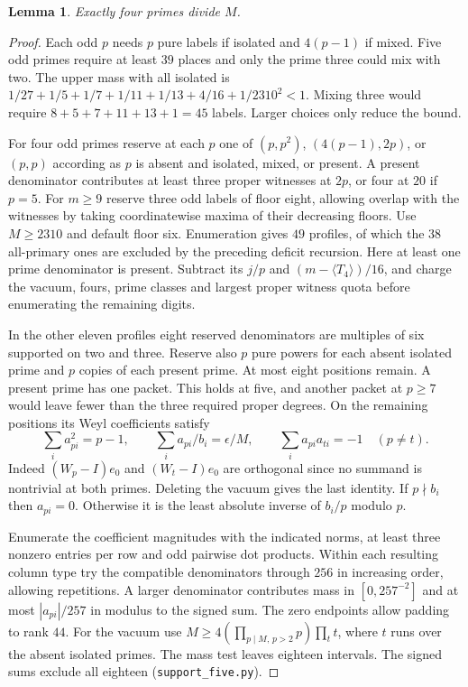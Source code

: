 \documentclass[11pt]{amsart}
\numberwithin{equation}{section}
\newtheorem{lemma}[theorem]{Lemma}
\theoremstyle{definition}
\theoremstyle{plain}
\begin{document}
\begin{lemma}
Exactly four primes divide $M$.
\end{lemma}
\begin{proof}
Each odd $p$ needs $p$ pure labels if isolated and $4(p-1)$ if mixed.
Five odd primes require at least $39$ places and only the prime three could
mix with two. The upper mass with all isolated is
$1/27+1/5+1/7+1/11+1/13+4/16+1/2310^2<1$.
Mixing three would require $8+5+7+11+13+1=45$ labels. Larger choices
only reduce the bound.

For four odd primes reserve at each $p$ one of $(p,p^2)$,
$(4(p-1),2p)$, or $(p,p)$ according as $p$ is absent and isolated,
mixed, or present. A present denominator contributes at least three
proper witnesses at $2p$, or four at $20$ if $p=5$. For $m\ge9$
reserve three odd labels of floor eight, allowing overlap with the
witnesses by taking coordinatewise maxima of their decreasing floors.
Use $M\ge2310$ and default floor six. Enumeration gives $49$
profiles, of which the $38$ all-primary ones are excluded by the
preceding deficit recursion. Here at least one prime denominator
is present. Subtract its $j/p$ and $(m-\langle T_4\rangle)/16$,
and charge the vacuum, fours, prime classes and largest proper
witness quota before enumerating the remaining digits.

In the other eleven profiles eight reserved denominators are multiples
of six supported on two and three. Reserve also $p$ pure powers
for each absent isolated prime and $p$ copies of each present prime.
At most eight positions remain. A present prime has one packet.
This holds at five, and another packet at $p\ge7$ would leave fewer
than the three required proper degrees. On the remaining positions
its Weyl coefficients satisfy
\[
 \sum_i a_{pi}^2=p-1,\qquad \sum_i a_{pi}/b_i=\epsilon/M,\qquad
 \sum_i a_{pi}a_{ti}=-1\quad(p\ne t).
\]
Indeed $(W_p-I)e_0$ and $(W_t-I)e_0$ are orthogonal since no summand
is nontrivial at both primes. Deleting the vacuum gives the last
identity. If $p\nmid b_i$ then $a_{pi}=0$. Otherwise it is the least
absolute inverse of $b_i/p$ modulo $p$.

Enumerate the coefficient magnitudes with the indicated norms, at
least three nonzero entries per row and odd pairwise dot products.
Within each resulting column type try the compatible denominators
through $256$ in increasing order, allowing repetitions. A larger
denominator contributes mass in $[0,257^{-2}]$ and at most
$|a_{pi}|/257$ in modulus to the signed sum. The zero endpoints
allow padding to rank $44$. For the vacuum use
$M\ge4(\prod_{p\mid M,\,p>2}p)\prod_{t}t$, where $t$ runs over
the absent isolated primes. The mass test leaves eighteen intervals. The signed sums exclude all eighteen (\texttt{support\_five.py}).
\end{proof}
\end{document}
